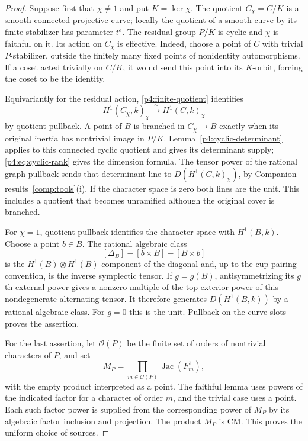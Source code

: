\documentclass[11pt]{article}
\theoremstyle{plain}
\theoremstyle{definition}
\theoremstyle{remark}
\numberwithin{equation}{section}
\begin{document}
\begin{proof}
Suppose first that $\chi\ne1$ and put $K=\ker\chi$.
The quotient $C_\chi=C/K$ is a smooth connected projective
curve; locally the quotient of a smooth curve by its finite
stabilizer has parameter $t^e$.  The residual group $P/K$
is cyclic and $\chi$ is faithful on it.  Its action on
$C_\chi$ is effective.  Indeed, choose a point of $C$ with
trivial $P$-stabilizer, outside the finitely many fixed points
of nonidentity automorphisms.  If a coset acted trivially on
$C/K$, it would send this point into its $K$-orbit, forcing
the coset to be the identity.

Equivariantly for the residual action,
\eqref{p4:finite-quotient} identifies
\[
 H^1(C_\chi,k)_\chi\xrightarrow{\;\sim\;}H^1(C,k)_\chi
\]
by quotient pullback.  A point of $B$ is branched in
$C_\chi\to B$ exactly when its original inertia has nontrivial
image in $P/K$.  Lemma~\ref{p4:cyclic-determinant} applies to
this connected cyclic quotient and gives its determinant supply;
\eqref{p4:eq:cyclic-rank} gives the dimension formula.
The tensor power of the rational graph pullback sends that determinant line to
$D(H^1(C,k)_\chi)$, by Companion results~\ref{comp:tools}\textup{(i)}.
If the character space is zero both lines are the unit.
This includes a quotient that becomes unramified although
the original cover is branched.

For $\chi=1$, quotient pullback identifies the character
space with $H^1(B,k)$.  Choose a point $b\in B$.
The rational algebraic class
\[
 [\Delta_B]-[b\times B]-[B\times b]
\]
is the $H^1(B)\otimes H^1(B)$ component of the diagonal and,
up to the cup-pairing convention, is the inverse symplectic
tensor.  If $g=g(B)$, antisymmetrizing its $g$th external
power gives a nonzero multiple of the top exterior power
of this nondegenerate alternating tensor.  It therefore
generates $D(H^1(B,k))$ by a rational algebraic class.
For $g=0$ this is the unit.  Pullback on the curve slots
proves the assertion.

For the last assertion, let $\mathcal O(P)$ be the finite set
of orders of nontrivial characters of $P$, and set
\[
 M_P=\prod_{m\in\mathcal O(P)}\operatorname{Jac}(F_m^1),
\]
with the empty product interpreted as a point.  The faithful
lemma uses powers of the indicated factor for a character
of order $m$, and the trivial case uses a point.  Each such
factor power is supplied from the corresponding power of
$M_P$ by its algebraic factor inclusion and projection.
The product $M_P$ is CM.  This proves the uniform choice
of sources.
\end{proof}
\end{document}
